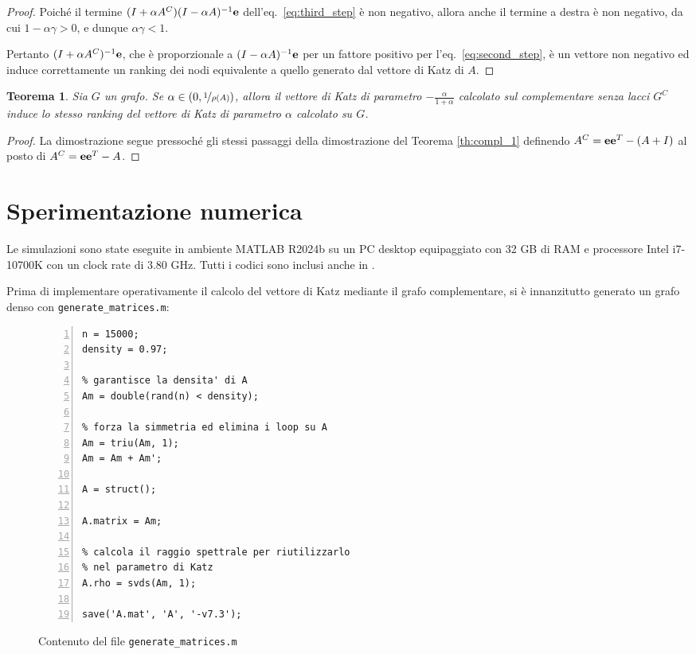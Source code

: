 \documentclass[a4paper]{article}
\newcommand{\evec}{{\bf e}}
\newtheorem{theorem}{Teorema}
\begin{document}
\begin{proof}
    Poiché il termine $(I + \alpha A^C) (I-\alpha A)^{-1} \evec$ dell'eq.~\eqref{eq:third_step} è non negativo, allora
    anche il termine a destra è non negativo, da cui
    $1 - \alpha \gamma > 0$, e dunque $\alpha \gamma < 1$.

    Pertanto $(I + \alpha A^C)^{-1} \evec$, che è proporzionale a $(I-\alpha A)^{-1} \evec$ per un fattore positivo per
    l'eq.~\eqref{eq:second_step}, è un vettore non negativo ed induce correttamente un ranking dei nodi equivalente
    a quello generato dal vettore di Katz di $A$.
\end{proof}

\begin{theorem}
    \label{th:compl_2}
    Sia $G$ un grafo. Se $\alpha \in (0, \nicefrac{1}{\rho(A)})$, allora il vettore di Katz di parametro $-\frac{\alpha}{1+\alpha}$ calcolato sul complementare senza lacci $G^C$
    induce lo stesso ranking del vettore di Katz di parametro $\alpha$ calcolato su $G$.
\end{theorem}

\begin{proof}
    La dimostrazione segue pressoché gli stessi passaggi della dimostrazione del Teorema \ref{th:compl_1} definendo
    $A^C = \evec \evec^T - (A+I)$ al posto di $A^C = \evec \evec^T - A$.
\end{proof}

\section{Sperimentazione numerica}

Le simulazioni sono state eseguite in ambiente MATLAB R2024b su un PC desktop equipaggiato con 32 GB di RAM e
processore Intel i7-10700K con un clock rate di 3.80 GHz. Tutti i codici sono inclusi anche in \cite{hearotCode}.

Prima di implementare operativamente il calcolo del vettore di Katz mediante il grafo complementare, si è innanzitutto generato
un grafo denso con \texttt{generate\_matrices.m}:

\begin{figure}[h]
    \centering
    \begin{lstlisting}[style=Matlab-editor, frame=single, numbers=left]
n = 15000;
density = 0.97;

% garantisce la densita' di A
Am = double(rand(n) < density);

% forza la simmetria ed elimina i loop su A
Am = triu(Am, 1);
Am = Am + Am';

A = struct();

A.matrix = Am;

% calcola il raggio spettrale per riutilizzarlo
% nel parametro di Katz
A.rho = svds(Am, 1);

save('A.mat', 'A', '-v7.3');        
    \end{lstlisting}
    \vskip -0.1in
    \caption{Contenuto del file \texttt{generate\_matrices.m}}
\end{figure}

\printbibliography
\end{document}
